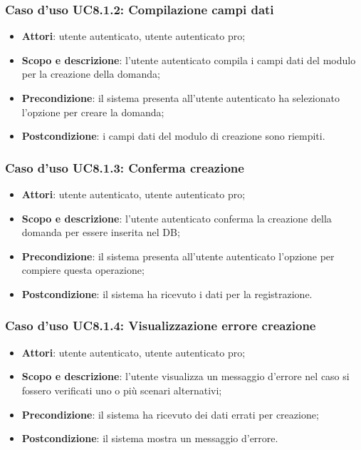 	\subsubsection{Caso d'uso UC8.1.2: Compilazione campi dati}
	\begin{itemize}
		\item
			\textbf{Attori}: utente autenticato, utente autenticato pro;
		\item
			\textbf{Scopo e descrizione}: l'utente autenticato compila i campi dati del modulo per la creazione della domanda;
		\item		
			\textbf{Precondizione}: il sistema presenta all'utente autenticato ha selezionato l'opzione per creare la domanda;
		\item
			\textbf{Postcondizione}: i campi dati del modulo di creazione sono riempiti.
	\end{itemize}	
	\subsubsection{Caso d'uso UC8.1.3: Conferma creazione}
	\begin{itemize}
		\item
			\textbf{Attori}: utente autenticato, utente autenticato pro;
		\item
			\textbf{Scopo e descrizione}: l'utente autenticato conferma la creazione della domanda per essere inserita nel DB;
		\item		
			\textbf{Precondizione}: il sistema presenta all'utente autenticato l'opzione per compiere questa operazione;
		\item
			\textbf{Postcondizione}: il sistema ha ricevuto i dati per la registrazione.
	\end{itemize}	
	\subsubsection{Caso d'uso UC8.1.4: Visualizzazione errore creazione}
	\begin{itemize}
		\item
			\textbf{Attori}: utente autenticato, utente autenticato pro;
		\item
			\textbf{Scopo e descrizione}: l'utente visualizza un messaggio d'errore nel caso si fossero verificati uno o più scenari alternativi;
		\item		
			\textbf{Precondizione}: il sistema ha ricevuto dei dati errati per creazione;
		\item
			\textbf{Postcondizione}: il sistema mostra un messaggio d'errore.
	\end{itemize}	
